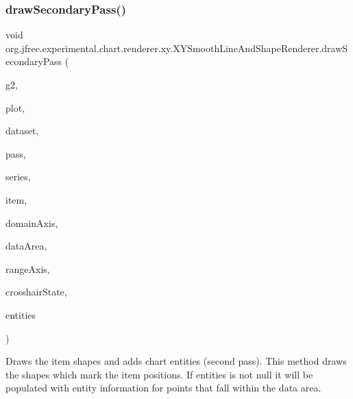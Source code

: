 \subsubsection{\texorpdfstring{draw\+Secondary\+Pass()}{drawSecondaryPass()}}
{\footnotesize\ttfamily void org.\+jfree.\+experimental.\+chart.\+renderer.\+xy.\+X\+Y\+Smooth\+Line\+And\+Shape\+Renderer.\+draw\+Secondary\+Pass (\begin{DoxyParamCaption}\item[{Graphics2D}]{g2,  }\item[{\mbox{\hyperlink{classorg_1_1jfree_1_1chart_1_1plot_1_1_x_y_plot}{X\+Y\+Plot}}}]{plot,  }\item[{\mbox{\hyperlink{interfaceorg_1_1jfree_1_1data_1_1xy_1_1_x_y_dataset}{X\+Y\+Dataset}}}]{dataset,  }\item[{int}]{pass,  }\item[{int}]{series,  }\item[{int}]{item,  }\item[{\mbox{\hyperlink{classorg_1_1jfree_1_1chart_1_1axis_1_1_value_axis}{Value\+Axis}}}]{domain\+Axis,  }\item[{Rectangle2D}]{data\+Area,  }\item[{\mbox{\hyperlink{classorg_1_1jfree_1_1chart_1_1axis_1_1_value_axis}{Value\+Axis}}}]{range\+Axis,  }\item[{\mbox{\hyperlink{classorg_1_1jfree_1_1chart_1_1plot_1_1_crosshair_state}{Crosshair\+State}}}]{crosshair\+State,  }\item[{\mbox{\hyperlink{interfaceorg_1_1jfree_1_1chart_1_1entity_1_1_entity_collection}{Entity\+Collection}}}]{entities }\end{DoxyParamCaption})\hspace{0.3cm}{\ttfamily [protected]}}

Draws the item shapes and adds chart entities (second pass). This method draws the shapes which mark the item positions. If {\ttfamily entities} is not {\ttfamily null} it will be populated with entity information for points that fall within the data area.


